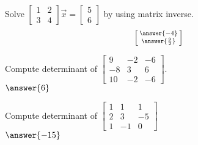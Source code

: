 \documentclass{ximera}
\begin{document}

\begin{exercise}
    Solve
    $\left[ 
        \begin{smallmatrix}
            1 & 2 \\
            3 & 4 
        \end{smallmatrix} 
    \right] 
    \vec{x} =
    \left[ 
        \begin{smallmatrix}
            5 \\
            6
        \end{smallmatrix} 
    \right]$ by using matrix inverse.
    \[
        \left[\begin{smallmatrix} \answer{-4} \\ \answer{\frac{9}{2}} \end{smallmatrix}\right]
    \]
\end{exercise}

\begin{exercise}
    Compute determinant of
    $\left[ 
        \begin{smallmatrix}
            9 & -2 & -6 \\
            -8 & 3 & 6 \\
            10 & -2 & -6
        \end{smallmatrix} 
    \right]$.\\
    $\answer{6}$
\end{exercise}

\begin{exercise}%
    Compute determinant of
    $\left[ 
        \begin{smallmatrix}
            1 & 1 & 1 \\
            2 & 3 & -5 \\
            1 & -1 & 0
        \end{smallmatrix}
    \right]$\\
    $\answer{-15}$
\end{exercise}
\end{document}
